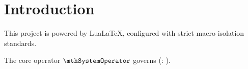 \chapter{Introduction}
This project is powered by LuaLaTeX, configured with strict macro isolation standards.

The core operator $\mthSystemOperator$ governs \txtSystemName (\abbrSystemName: \jaSystemName).
